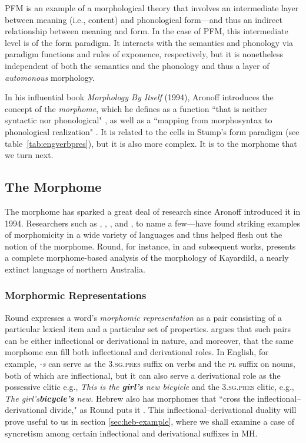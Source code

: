 \ac{PFM} is an example of a morphological theory that involves an intermediate layer between
meaning (i.e., content) and phonological form---and thus an indirect relationship between
meaning and form. In the case of \ac{PFM}, this intermediate
level is of the form paradigm. It interacts with the semantics and phonology 
via paradigm functions and rules of exponence, respectively,
but it is nonetheless independent of both the semantics and the phonology and thus a layer of \emph{automonous} morphology.  

In his influential book \textit{Morphology By Itself} (1994), Aronoff 
introduces the concept of the \emph{morphome}, which he
defines as a function ``that is neither 
syntactic nor phonological" \cite[][p. 25]{aronoff:1994},
as well as a
``mapping from morphosyntax to phonological realization" \citep[][p. 25]{aronoff:1994}. 
It is related
to the cells in Stump's form paradigm (see table~\ref{tab:engverbpres}), 
but it is also more complex. It is to the morphome that we turn next.

\subsection{The Morphome}
\label{sec:the-morphome}
The morphome has sparked a 
great deal of research since Aronoff introduced it in 1994. Researchers
such as \cite{maiden:2005, maiden:md:2016}, \cite{round:2009, round:2011, 
round:2012, round:2015, round:md:2016}, \cite{oneill:2014b,oneill:2018}, and \cite{bonami:2008, bonami:2010}, to name 
a few---have found striking examples of morphomicity in a wide variety of 
languages and thus helped flesh out the notion of the morphome.
Round, for instance, in \cite{round:2009} and subsequent works, 
presents a complete morphome-based analysis of the morphology of 
Kayardild, a nearly extinct language of northern Australia. 

\subsubsection{Morphormic Representations}
Round expresses a word's \emph{morphomic representation} as a pair 
consisting of a particular lexical item and a particular set of properties.
\cite{round:2011} argues that such pairs can be either inflectional 
 or derivational in nature, and moreover, that the same morphome can fill 
 both inflectional and derivational roles. In English, for example, \emph{-s} 
 can serve as the \textsc{3.sg.pres} suffix on verbs and the \textsc{pl} 
 suffix on nouns, both of which are inflectional, but it can also serve a derivational 
 role as the possessive clitic e.g., \emph{This is the \textbf{girl's} new bicyicle} and 
 the \textsc{3.sg.pres} clitic, e.g., \emph{The girl's\textbf{bicycle's} new.} 
 Hebrew also has morphomes that ``cross the inflectional--derivational divide," 
 as Round puts it \citep[][p.14]{round:2015}. This inflectional--derivational 
 duality will prove useful to us in section \ref{sec:heb-example}, where we shall 
 examine a case of syncretism among certain inflectional and derivational suffixes in \ac{MH}.
  
